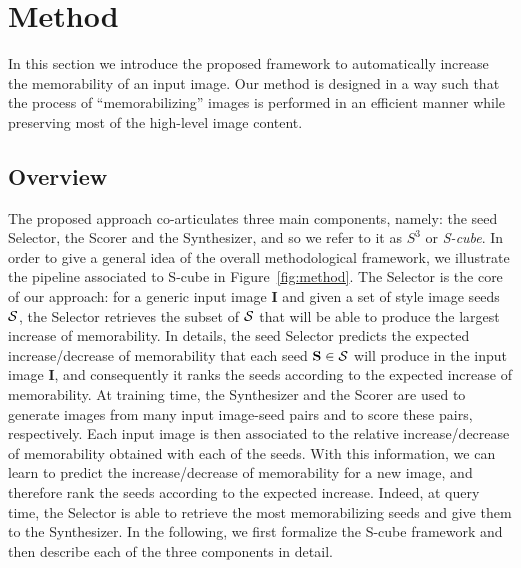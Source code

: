 \documentclass{sig-alternate-05-2015}
\begin{document}
\section{Method}

In this section we introduce the proposed framework to automatically increase the memorability of an input image. Our method is designed in a way such that the process of ``memorabilizing'' images is performed in an efficient manner while preserving most of the high-level image content. %

\subsection{Overview}
The proposed approach co-articulates three main components, namely: the seed Selector, the Scorer and the Synthesizer, and so we refer to it as $S^3$ or \emph{S-cube}. In order to give a general idea of the overall methodological framework, we illustrate the pipeline associated to S-cube in Figure~\ref{fig:method}. The {Selector} is the core of our approach: for a generic input image $\textbf{I}$ and given a set of style image seeds ${\cal S}$, the Selector retrieves the subset of ${\cal S}$ that will be able to produce the largest increase of memorability. In details, the seed Selector predicts the expected increase/decrease of memorability that each seed $\mathbf{S}\in{\cal S}$ will produce in the input image $\mathbf{I}$, and consequently it ranks the seeds according to the expected increase of memorability. At training time, the Synthesizer and the Scorer are used to generate images from many input image-seed pairs and to score these pairs, respectively. Each input image is then associated to the relative increase/decrease of memorability obtained with each of the seeds. With this information, we can learn to predict the increase/decrease of memorability for a new image, and therefore rank the seeds according to the expected increase. Indeed, at query time, the Selector is able to retrieve the most memorabilizing seeds and give them to the Synthesizer. In the following, we first formalize the S-cube framework and then describe each of the three components in detail.
\end{document}
